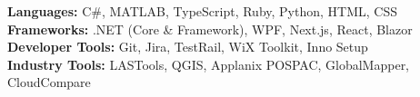 
\textbf{Languages:} C\#, MATLAB, TypeScript, Ruby, Python, HTML, CSS\\
\textbf{Frameworks:} .NET (Core \& Framework), WPF, Next.js, React, Blazor \\
\textbf{Developer Tools:} Git, Jira, TestRail, WiX Toolkit, Inno Setup \\
\textbf{Industry Tools:} LASTools, QGIS, Applanix POSPAC, GlobalMapper, CloudCompare